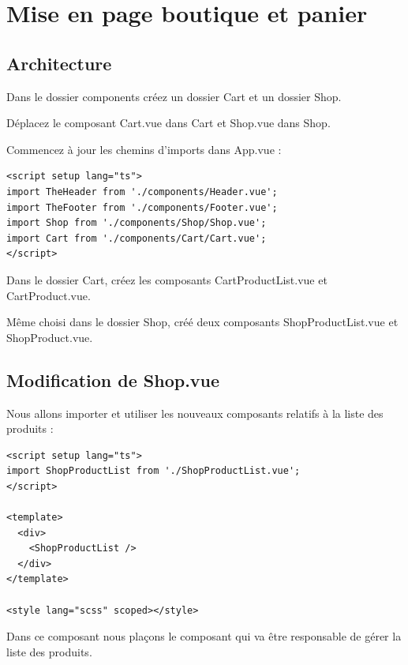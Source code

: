 
\section{Mise en page boutique et panier}
\subsection{Architecture}
Dans le dossier components créez un dossier Cart et un dossier Shop.

Déplacez le composant Cart.vue dans Cart et Shop.vue dans Shop.

Commencez à jour les chemins d'imports dans App.vue :
\begin{verbatim}
<script setup lang="ts">
import TheHeader from './components/Header.vue';
import TheFooter from './components/Footer.vue';
import Shop from './components/Shop/Shop.vue';
import Cart from './components/Cart/Cart.vue';
</script>
\end{verbatim}

Dans le dossier Cart, créez les composants CartProductList.vue et CartProduct.vue.

Même choisi dans le dossier Shop, créé deux composants ShopProductList.vue et ShopProduct.vue.

\subsection{Modification de {\color{monOrange}Shop.vue}}
Nous allons importer et utiliser les nouveaux composants relatifs à la liste des produits :
\begin{verbatim}
<script setup lang="ts">
import ShopProductList from './ShopProductList.vue';
</script>

<template>
  <div>
    <ShopProductList />
  </div>
</template>

<style lang="scss" scoped></style>
\end{verbatim}
Dans ce composant nous plaçons le composant qui va être responsable de gérer la liste des produits.

